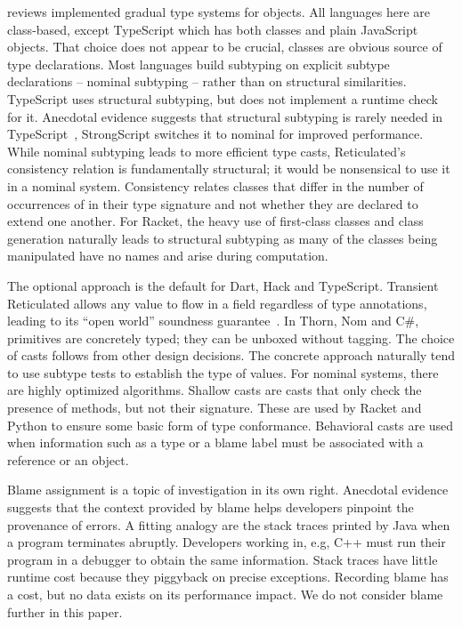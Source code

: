 \documentclass[USenglish]{tex/lipics-v2016}
\begin{document}
 reviews implemented gradual type systems for objects.  All
languages here are class-based, except TypeScript which has both classes and
plain JavaScript objects. That choice does not appear to be crucial, classes
are obvious source of type declarations.  Most languages build subtyping on
explicit subtype declarations -- nominal subtyping -- rather than on
structural similarities.  TypeScript uses structural subtyping, but does not
implement a runtime check for it.  Anecdotal evidence suggests that
structural subtyping is rarely needed in TypeScript~\cite{ecoop15},
Strong\-Script switches it to nominal for improved performance. While
nominal subtyping leads to more efficient type casts, Reticulated's
consistency relation is fundamentally structural; it would be nonsensical to
use it in a nominal system. Consistency relates classes that differ in the
number of occurrences of \any in their type signature and not whether they
are declared to extend one another.  For Racket, the heavy use of
first-class classes and class generation naturally leads to structural
subtyping as many of the classes being manipulated have no names and arise
during computation.

The optional approach is the default for Dart, Hack and TypeScript.
Transient Reticulated allows any value to flow in a field regardless of type
annotations, leading to its ``open world'' soundness
guarantee~\cite{siek14}.  In Thorn, Nom and C\#, primitives are concretely
typed; they can be unboxed without tagging.  The choice of casts follows
from other design decisions. The concrete approach naturally tend to use
subtype tests to establish the type of values. For nominal systems, there
are highly optimized algorithms. Shallow casts are casts that only check the
presence of methods, but not their signature. These are used by Racket and
Python to ensure some basic form of type conformance.  Behavioral casts are
used when information such as a type or a blame label must be associated
with a reference or an object.

Blame assignment is a topic of investigation in its own right. Anecdotal
evidence suggests that the context provided by blame helps developers
pinpoint the provenance of errors. A fitting analogy are the stack traces
printed by Java when a program terminates abruptly. Developers working in,
e.g, C++ must run their program in a debugger to obtain the same
information. Stack traces have little runtime cost because they piggyback on
precise exceptions. Recording blame has a cost, but no data exists on its
performance impact. We do not consider blame further in this paper.
\end{document}
